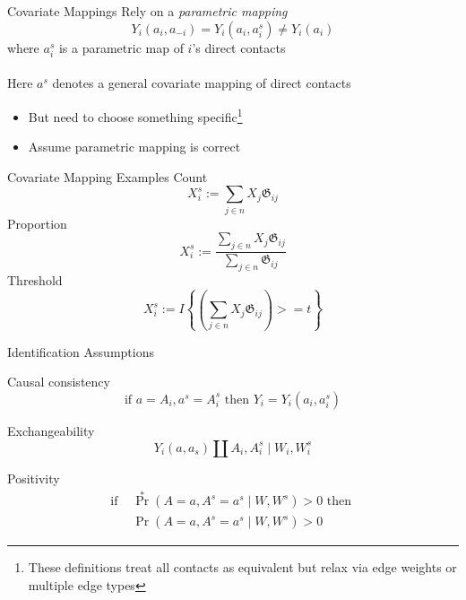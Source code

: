 \documentclass{beamer}
\begin{document}
\begin{frame}{Covariate Mappings}
	Rely on a \textit{parametric mapping}
	\begin{equation*}
		Y_i(a_i, a_{-i}) = Y_i(a_i, a_i^s) \ne Y_i(a_i)
	\end{equation*}
	where $a_i^s$ is a parametric map of $i$'s direct contacts
	~\\~\\
	Here $a^s$ denotes a general covariate mapping of direct contacts
	\begin{itemize}
		\item But need to choose something specific\footnote[frame]{These definitions treat all contacts as equivalent but relax via edge weights or multiple edge types}
		\item Assume parametric mapping is correct
	\end{itemize}
\end{frame}

\begin{frame}{Covariate Mapping Examples}
	Count
	\begin{equation*}
		X_i^s := \sum_{j \in n} X_j \mathfrak{G}_{ij}
	\end{equation*}
	Proportion
	\begin{equation*}
		X_i^s := \frac{\sum_{j \in n} X_j \mathfrak{G}_{ij}}{\sum_{j \in n} \mathfrak{G}_{ij}}
	\end{equation*}
	Threshold
	\begin{equation*}
		X_i^s := I \left\{ \left(\sum_{j \in n} X_j \mathfrak{G}_{ij}\right) >= t \right\}
	\end{equation*}
\end{frame}

\begin{frame}{Identification Assumptions}
	\begin{block}{Causal consistency}
		\begin{equation*}
			\text{if } a = A_i, a^s = A_i^s \text{ then } Y_i = Y_i(a_i, a_i^s)
		\end{equation*}
	\end{block}
	\begin{block}{Exchangeability}
		\begin{equation*}
			Y_i(a, a_s) \amalg A_i ,A_i^s \mid W_i, W_i^s
		\end{equation*}
	\end{block}
	\begin{block}{Positivity}
		\begin{align*}
			\text{if } & {\Pr}^*(A=a,A^s=a^s \mid W,W^s) > 0 \text{ then } \\
			& \Pr(A=a,A^s=a^s \mid W,W^s) > 0
		\end{align*}
	\end{block}
\end{frame}
\end{document}
